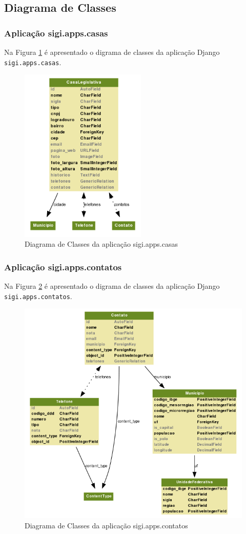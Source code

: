 \subsection{Diagrama de Classes}
\subsubsection{Aplicação sigi.apps.casas}
Na Figura \ref{fig:casas} é apresentado o digrama de classes da
aplicação Django \verb|sigi.apps.casas|.

\begin{figure}[h]
  \centering
  \includegraphics[width=60mm]{../imagens/casas.png}
  \caption{Diagrama de Classes da aplicação sigi.apps.casas}
  \label{fig:casas}
\end{figure}

\subsubsection{Aplicação sigi.apps.contatos}
Na Figura \ref{fig:contatos} é apresentado o digrama de classes da
aplicação Django \verb|sigi.apps.contatos|.

\begin{figure}[h]
  \centering
  \includegraphics[width=120mm]{../imagens/contatos.png}
  \caption{Diagrama de Classes da aplicação sigi.apps.contatos}
  \label{fig:contatos}
\end{figure}

